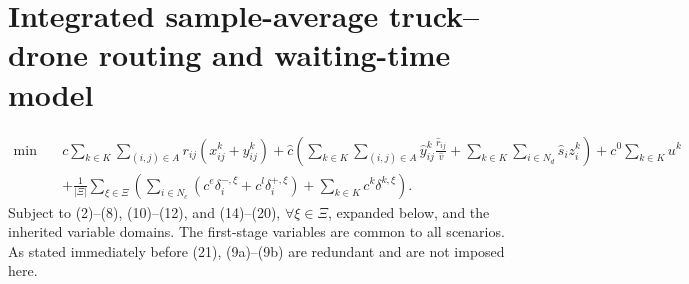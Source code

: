 \documentclass[10pt]{article}
\begin{document}
\section*{Integrated sample-average truck--drone routing and waiting-time model}
\begin{equation}
\begin{aligned}
\min\quad &c\sum_{k\in K}\sum_{(i,j)\in A}r_{ij}(x_{ij}^k+y_{ij}^k)
+\hat c\left(\sum_{k\in K}\sum_{(i,j)\in A}\hat y_{ij}^k\frac{\hat r_{ij}}{\hat v}
+\sum_{k\in K}\sum_{i\in N_d}\hat s_i z_i^k\right)
+c^0\sum_{k\in K}u^k\\
&+\frac{1}{|\Xi|}\sum_{\xi\in\Xi}\left(\sum_{i\in N_c}(c^e\delta_i^{-,\xi}+c^l\delta_i^{+,\xi})+\sum_{k\in K}c^k\delta^{k,\xi}\right).
\end{aligned}\tag{21}
\end{equation}
\noindent Subject to (2)--(8), (10)--(12), and (14)--(20), $\forall\xi\in\Xi$, expanded below, and the inherited variable domains. The first-stage variables are common to all scenarios. As stated immediately before (21), (9a)--(9b) are redundant and are not imposed here.
\end{document}
